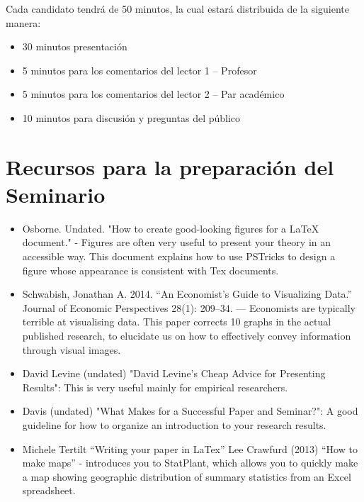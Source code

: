 Cada candidato tendrá de 50 minutos, la cual estará distribuida de la siguiente manera:
\begin{itemize}
    \item 30 minutos presentación
    \item 5 minutos para los comentarios del lector 1 – Profesor
    \item 5 minutos para los comentarios del lector 2 – Par académico
    \item 10 minutos para discusión y preguntas del público
\end{itemize}

\section{Recursos para la preparación del Seminario}

\begin{itemize}
    \item Osborne. Undated. "How to create good-looking figures for a LaTeX document." - Figures are often very useful to present your theory in an accessible way. This document explains how to use PSTricks to design a figure whose appearance is consistent with Tex documents.
    \item Schwabish, Jonathan A. 2014. “An Economist’s Guide to Visualizing Data.” Journal of Economic Perspectives 28(1): 209–34. --- Economists are typically terrible at visualising data. This paper corrects 10 graphs in the actual published research, to elucidate us on how to effectively convey information through visual images.
    \item David Levine (undated) "David Levine's Cheap Advice for Presenting Results": This is very useful mainly for empirical researchers.
    \item Davis (undated) "What Makes for a Successful Paper and Seminar?": A good guideline for how to organize an introduction to your research results.
    \item Michele Tertilt “Writing your paper in LaTex” Lee Crawfurd (2013) “How to make maps” - introduces you to StatPlant, which allows you to quickly make a map showing geographic distribution of summary statistics from an Excel spreadsheet.
\end{itemize}